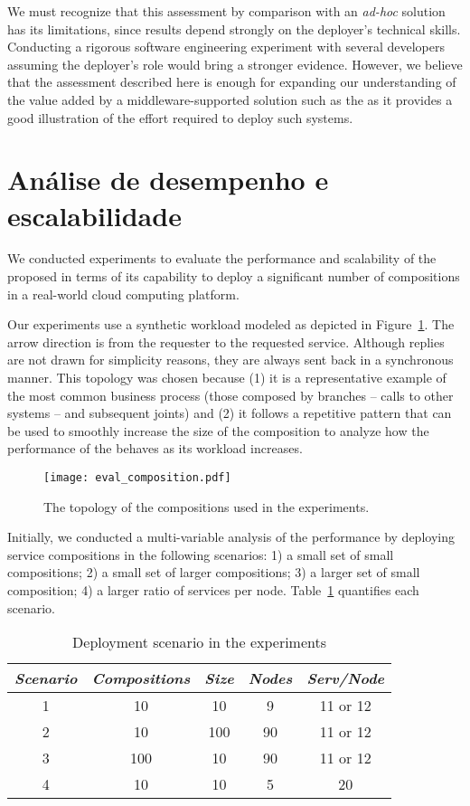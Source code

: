 We must recognize that this assessment by comparison with an \emph{ad-hoc} solution 
has its limitations,
since results depend strongly on the deployer's technical skills.
Conducting a rigorous software engineering experiment with several developers
assuming the deployer's role would bring a stronger evidence.
However, we believe that the assessment described here is enough for 
expanding our understanding of the value added by a middleware-supported
solution such as the \choreos \ee as it provides a good illustration
of the effort required to deploy such systems.

\section{Análise de desempenho e escalabilidade}

We conducted experiments to evaluate the performance and scalability of
the proposed \ee in terms of its capability to deploy a significant number of
compositions in a real-world cloud computing platform.

Our experiments use a synthetic workload modeled
as depicted in Figure~\ref{fig:eval_composition}.
The arrow direction is from the requester to the requested service.
Although replies are not drawn for simplicity reasons, they are always sent back
in a synchronous manner.
This topology was chosen because (1) it is a representative example of the most common business process (those composed by branches -- calls to other systems -- and subsequent joints) and (2) it follows a repetitive pattern that can be used to smoothly increase the size of the composition to analyze how the performance of the \ee behaves as its workload increases.

\begin{figure}[h]
  \centering
  \texttt{[image: eval\_composition.pdf]}
  \caption{The topology of the compositions used in the experiments.}
  \label{fig:eval_composition}
\end{figure}


Initially, we conducted a multi-variable analysis of the \ee performance by deploying service compositions
in the following scenarios:
1) a small set of small compositions;
2) a small set of larger compositions;
3) a larger set of small composition;
4) a larger ratio of services per node.
Table~\ref{tab:cases} quantifies each scenario.

\begin{table}
\centering
\caption{Deployment scenario in the experiments}
\label{tab:cases}
\begin{tabular}{c c c c c} \hline
\emph{Scenario} & \emph{Compositions} & \emph{Size} & \emph{Nodes} & \emph{Serv/Node} \\ \hline
1 &  10 &  10 &  9 & 11 or 12 \\
2 &  10 & 100 & 90 & 11 or 12 \\
3 & 100 &  10 & 90 & 11 or 12 \\
4 &  10 &  10 &  5 &       20 \\
\hline \end{tabular}
\end{table}

